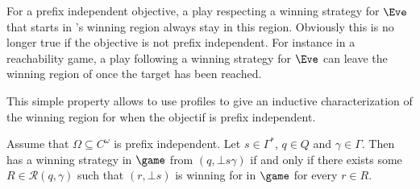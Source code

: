 \begin{remark} 
\label{11-rem:stay-staying-alive}
For a prefix independent objective, a play respecting a winning strategy for $\Eve$ that starts in \Eve's winning region always stay in this region. Obviously this is no longer true if the objective is not prefix independent. For instance in a reachability game, a play following a winning strategy for $\Eve$ can leave the winning region of \Eve once the target has been reached. 	
\end{remark}


This simple property allows to use profiles to give an inductive characterization of the winning region for \Eve when the objectif is prefix independent.

\begin{proposition}\label{11-prop:returning} Assume that $\Omega\subseteq C^\omega$ is prefix independent. 
Let $s\in \Gamma^*$, $q\in Q$ and $\gamma\in\Gamma$. Then \Eve has a winning strategy in $\game$ from $(q,\bot s\gamma)$ if and only if there exists some $R\in\mathcal{R}(q,\gamma)$ such that $(r,\bot s)$ is winning for \Eve in $\game$ for every $r\in R$.
\end{proposition}

